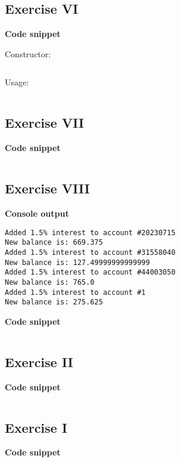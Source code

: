 \documentclass[english,a4paper,]{report}
\begin{document}
\subsection{Exercise VI}\label{exercise-vi}

\textbf{Code snippet}

Constructor:
\inputminted[firstline=12,lastline=14]{java}{code_samples/Account.java}

Usage:
\inputminted[firstline=30,lastline=30]{java}{code_samples/ManageAccount.java}

\subsection{Exercise VII}\label{exercise-vii}

\textbf{Code snippet}

\inputminted[firstline=31,lastline=31]{java}{code_samples/ManageAccount.java}

\subsection{Exercise VIII}\label{exercise-viii}

\textbf{Console output}

\begin{verbatim}
Added 1.5% interest to account #20230715
New balance is: 669.375
Added 1.5% interest to account #31558040
New balance is: 127.49999999999999
Added 1.5% interest to account #44003050
New balance is: 765.0
Added 1.5% interest to account #1
New balance is: 275.625
\end{verbatim}

\textbf{Code snippet}

\inputminted[firstline=54,lastline=56]{java}{code_samples/Account.java}

\subsection{Exercise II}\label{exercise-ii-2}

\textbf{Code snippet}

\inputminted[firstline=16,lastline=22]{java}{code_samples/Account.java}

\subsection{Exercise I}\label{exercise-i-2}

\textbf{Code snippet}
\end{document}
